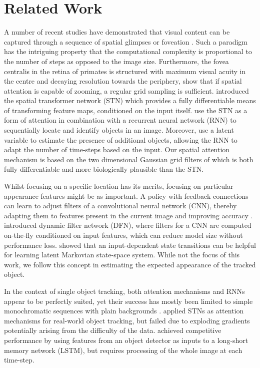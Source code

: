 \section{Related Work}
\label{sec:background}

A number of recent studies have demonstrated that visual content can be captured through a sequence of spatial glimpses or foveation \cite{Graves2014recurrent, Gregor2016towards}. Such a paradigm has the intriguing property that the computational complexity is proportional to the number of steps as opposed to the image size.
Furthermore, the fovea centralis in the retina of primates is structured with maximum visual acuity in the centre and decaying resolution towards the periphery, \citet{Olshausen2016foveal} show that if spatial attention is capable of zooming, a regular grid sampling is sufficient. 
\citet{Jaderberg2015} introduced the spatial transformer network (STN) which provides a fully differentiable means of transforming feature maps, conditioned on the input itself. \citet{Eslami2016air} use the STN as a form of attention in combination with a recurrent neural network (RNN) to sequentially locate and identify objects in an image. Moreover, \citet{Eslami2016air} use a latent variable to estimate the presence of additional objects, allowing the RNN to adapt the number of time-steps based on the input. 
Our spatial attention mechanism is based on the two dimensional Gaussian grid filters of  \cite{Kahou2015ratm} which is both fully differentiable and more biologically plausible than the STN.  


    
Whilst focusing on a specific location has its merits, focusing on particular appearance features might be as important. A policy with feedback connections can learn to adjust filters of a convolutional neural network (CNN), thereby adapting them to features present in the current image and improving accuracy \cite{Stollenga2014}. \citet{Brabandere2016dfn} introduced dynamic filter network (DFN), where filters for a CNN are computed on-the-fly conditioned on input features, which can reduce model size without performance loss. \citet{Karl2017dvbf} showed that an input-dependent state transitions can be helpful for learning latent Markovian state-space system. While not the focus of this work, we follow this concept in estimating the expected appearance of the tracked object.
    
In the context of single object tracking, both attention mechanisms and RNNs appear to be perfectly suited, yet their success has mostly been limited to simple monochromatic sequences with plain backgrounds \cite{Kahou2015ratm}. \citet{Cheung2016gtc} applied STNs \cite{Jaderberg2015} as attention mechanisms for real-world object tracking, but failed due to exploding gradients potentially arising from the difficulty of the data.
\citet{Ning2016} achieved competitive performance by using features from an object detector as inputs to a long-short memory network (LSTM), but requires processing of the whole image at each time-step. 

